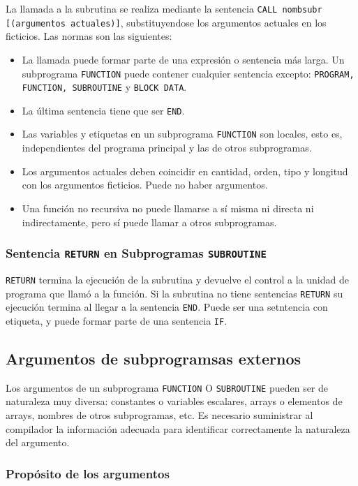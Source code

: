 La llamada a la subrutina se realiza mediante la sentencia {\tt CALL nombsubr [(argumentos actuales)]}, substituyendose los argumentos actuales en los ficticios. Las normas son las siguientes:

\begin{itemize}
	\item La llamada puede formar parte de una expresión o sentencia más larga. Un subprograma {\tt FUNCTION} puede contener cualquier sentencia excepto: {\tt PROGRAM, FUNCTION, SUBROUTINE} y {\tt BLOCK DATA}.
	\item La última sentencia tiene que ser {\tt END}. 
	\item Las variables y etiquetas en un subprograma {\tt FUNCTION} son locales, esto es, independientes del programa principal y las de otros subprogramas. 
	\item Los argumentos actuales deben coincidir en cantidad, orden, tipo y longitud con los argumentos ficticios. Puede no haber argumentos.
	\item Una función no recursiva no puede llamarse a sí misma ni directa ni indirectamente, pero sí puede llamar a otros subprogramas.
\end{itemize}

\subsubsection{Sentencia {\tt RETURN} en Subprogramas {\tt SUBROUTINE}}

{\tt RETURN} termina la ejecución de la subrutina y devuelve el control a la unidad de programa que llamó a la función. Si la subrutina no tiene sentencias {\tt RETURN} su ejecución termina al llegar a la sentencia {\tt END}. Puede ser una setntencia con etiqueta, y puede formar parte de una sentencia {\tt IF}.

\subsection{Argumentos de subprogramsas externos}

Los argumentos de un subprograma {\tt FUNCTION} O {\tt SUBROUTINE} pueden ser de naturaleza muy diversa: constantes o variables escalares, arrays o elementos de arrays, nombres de otros subprogramas, etc. Es necesario suministrar al compilador la información adecuada para identificar correctamente la naturaleza del argumento. 

\subsubsection{Propósito de los argumentos}

